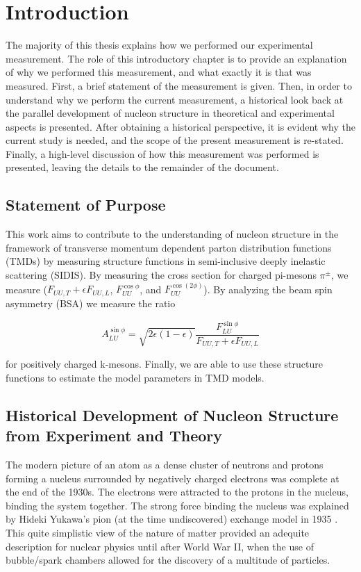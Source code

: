 \chapter{Introduction}
The majority of this thesis explains how we performed our experimental measurement.  The role of this introductory chapter is to provide an explanation of why we performed this measurement, and what exactly it is that was measured.  First, a brief statement of the measurement is given.  Then, in order to understand why we perform the current measurement, a historical look back at the parallel development of nucleon structure in theoretical and experimental aspects is presented.  After obtaining a historical perspective, it is evident why the current study is needed, and the scope of the present measurement is re-stated.  Finally, a high-level discussion of how this measurement was performed is presented, leaving the details to the remainder of the document.

\section{Statement of Purpose}
This work aims to contribute to the understanding of nucleon structure in the framework of transverse momentum dependent parton distribution functions (TMDs) by measuring structure functions in semi-inclusive deeply inelastic scattering (SIDIS).  By measuring the cross section for charged pi-mesons $\pi^{\pm}$, we measure ($F_{UU,T} + \epsilon F_{UU,L}$, $F_{UU}^{\cos\phi}$, and $F_{UU}^{\cos(2\phi)}$).  By analyzing the beam spin asymmetry (BSA) we measure the ratio

\begin{equation}
  A_{LU}^{\sin\phi} = \sqrt{2\epsilon(1-\epsilon)} \frac{F_{LU}^{\sin\phi}}{F_{UU,T}+\epsilon F_{UU,L}}
\end{equation}

for positively charged k-mesons.  Finally, we are able to use these structure functions to estimate the model parameters in TMD models.

\section{Historical Development of Nucleon Structure from Experiment and Theory}

The modern picture of an atom as a dense cluster of neutrons and protons forming a nucleus surrounded by negatively charged electrons was complete at the end of the 1930s.  The electrons were attracted to the protons in the nucleus, binding the system together.  The strong force binding the nucleus was explained by Hideki Yukawa's pion (at the time undiscovered) exchange model in 1935 \cite{physics-yukawa}.  This quite simplistic view of the nature of matter provided an adequite description for nuclear physics until after World War II, when the use of bubble/spark chambers allowed for the discovery of a multitude of particles.  \\

